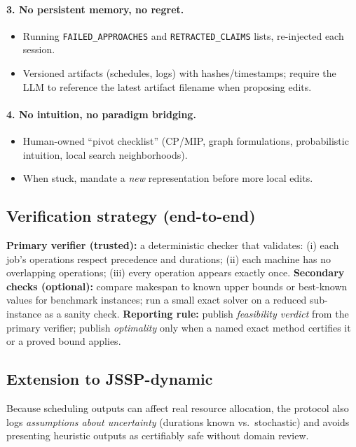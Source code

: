 \documentclass[11pt]{article}
\begin{document}
\paragraph{3. No persistent memory, no regret.}
\begin{itemize}[noitemsep]
  \item Running \texttt{FAILED\_APPROACHES} and \texttt{RETRACTED\_CLAIMS} lists, re-injected each session.
  \item Versioned artifacts (schedules, logs) with hashes/timestamps; require the LLM to reference the latest artifact filename when proposing edits.
\end{itemize}

\paragraph{4. No intuition, no paradigm bridging.}
\begin{itemize}[noitemsep]
  \item Human-owned ``pivot checklist'' (CP/MIP, graph formulations, probabilistic intuition, local search neighborhoods).
  \item When stuck, mandate a \emph{new} representation before more local edits.
\end{itemize}

\subsection{Verification strategy (end-to-end)}
\textbf{Primary verifier (trusted):} a deterministic checker that validates:
(i) each job's operations respect precedence and durations;
(ii) each machine has no overlapping operations;
(iii) every operation appears exactly once.
\textbf{Secondary checks (optional):} compare makespan to known upper bounds or best-known values for benchmark instances; run a small exact solver on a reduced sub-instance as a sanity check.
\textbf{Reporting rule:} publish \emph{feasibility verdict} from the primary verifier; publish \emph{optimality} only when a named exact method certifies it or a proved bound applies.

\subsection{Extension to JSSP-dynamic}
Because scheduling outputs can affect real resource allocation, the protocol also logs \emph{assumptions about uncertainty} (durations known vs.\ stochastic) and avoids presenting heuristic outputs as certifiably safe without domain review.
\end{document}
